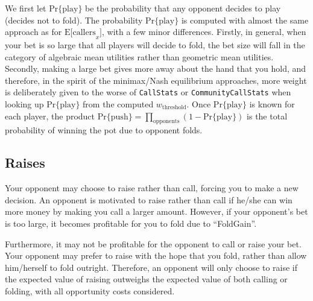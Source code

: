 We first let $\mathrm{Pr\{play\}}$ be the probability that any opponent decides to play (decides not to fold).
The probability $\mathrm{Pr\{play\}}$ is computed with almost the same approach as for $\mathrm{E[callers}_x]$, with a few minor differences.
Firstly, in general, when your bet is so large that all players will decide to fold, the bet size will fall in the category of algebraic mean utilities rather than geometric mean utilities.
Secondly, making a large bet gives more away about the hand that you hold, and therefore, in the spirit of the minimax/Nash equilibrium approaches, more weight is deliberately given to the worse of \texttt{CallStats} or \texttt{CommunityCallStats} when looking up $\mathrm{Pr\{play\}}$ from the computed $w_{\mathrm{threshold}}$.
Once $\mathrm{Pr\{play\}}$ is known for each player, the product $\mathrm{Pr\{push\}} = \prod_{\mathrm{opponents}} \left( 1 - \mathrm{Pr\{play\}} \right)$ is the total probability of winning the pot due to opponent folds.



\subsection{Raises}
\label{sec:Raises}
Your opponent may choose to raise rather than call, forcing you to make a new decision.
An opponent is motivated to raise rather than call if he/she can win more money by making you call a larger amount.
However, if your opponent's bet is too large, it becomes profitable for you to fold due to ``FoldGain''.

Furthermore, it may not be profitable for the opponent to call or raise your bet.
Your opponent may prefer to raise with the hope that you fold, rather than allow him/herself to fold outright.
Therefore, an opponent will only choose to raise if the expected value of raising outweighs the expected value of both calling or folding, with all opportunity costs considered.

